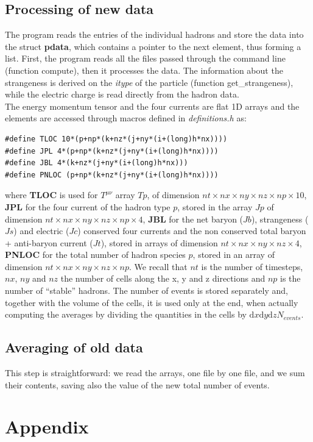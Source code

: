 \documentclass[12pt, a4paper]{article}
\newcommand{\dd}{\mathrm{d}}
\begin{document}
\subsection{Processing of new data}
The program reads the entries of the individual hadrons and store the data into the struct \textbf{pdata}, which contains a pointer to the next element, thus forming a list. First, the program reads all the files passed through the command line (function compute), then it processes the data. The information about the strangeness is derived on the \emph{itype} of the particle (function get\_strangeness), while the electric charge is read directly from the hadron data.\\
The energy momentum tensor and the four currents are flat 1D arrays and the elements are accessed through macros defined in \emph{definitions.h} as:
\begin{verbatim}
#define TLOC 10*(p+np*(k+nz*(j+ny*(i+(long)h*nx))))
#define JPL 4*(p+np*(k+nz*(j+ny*(i+(long)h*nx))))
#define JBL 4*(k+nz*(j+ny*(i+(long)h*nx)))
#define PNLOC (p+np*(k+nz*(j+ny*(i+(long)h*nx))))
\end{verbatim}
where \textbf{TLOC} is used for $T^{\mu\nu}$ array $Tp$, of dimension $nt\times nx \times ny \times nz \times np \times 10$, \textbf{JPL} for the four current of the hadron type $p$, stored in the array $Jp$ of dimension $nt\times nx\times ny\times nz \times np\times4$, \textbf{JBL} for the net baryon ($Jb$), strangeness ($Js$) and electric ($Jc$) conserved four currents and the non conserved total baryon + anti-baryon current ($Jt$), stored in arrays of dimension $nt \times nx \times ny \times nz \times 4$, \textbf{PNLOC} for the total number of hadron species $p$, stored in an array of dimension $nt \times nx \times ny \times nz \times np$. We recall that $nt$ is the number of timesteps, $nx$, $ny$ and $nz$ the number of cells along the x, y and z directions and $np$ is the number of ``stable'' hadrons. The number of events is stored separately and, together with the volume of the cells, it is used only at the end, when actually computing the averages by dividing the quantities in the cells by $\dd x \dd y \dd z N_{events}$.
\subsection{Averaging of old data}
This step is straightforward: we read the arrays, one file by one file, and we sum their contents, saving also the value of the new total number of events. 
\appendix
\section{Appendix}
\end{document}
